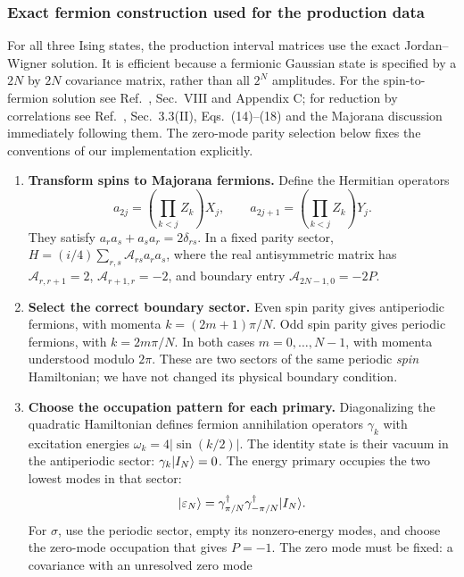\subsubsection{Exact fermion construction used for the production data}
For all three Ising states, the production interval
matrices use the exact Jordan--Wigner solution. It is efficient
because a fermionic Gaussian state is specified by a $2N$ by $2N$
covariance matrix, rather than all $2^N$ amplitudes.
For the spin-to-fermion solution see Ref.~\cite{Montes2017}, Sec.~VIII
and Appendix C; for reduction by correlations see
Ref.~\cite{PeschelEisler}, Sec.~3.3(II), Eqs.~(14)--(18) and the
Majorana discussion immediately following them. The zero-mode parity
selection below fixes the conventions of our implementation explicitly.
\begin{enumerate}
\item \textbf{Transform spins to Majorana fermions.}
Define the Hermitian operators
\begin{equation}
 a_{2j}=\left(\prod_{k<j}Z_k\right)X_j,\qquad
 a_{2j+1}=\left(\prod_{k<j}Z_k\right)Y_j.
\end{equation}
They satisfy $a_ra_s+a_sa_r=2\delta_{rs}$.
In a fixed parity sector,
$H=(i/4)\sum_{r,s}\mathcal A_{rs}a_ra_s$, where the real
antisymmetric matrix has $\mathcal A_{r,r+1}=2$,
$\mathcal A_{r+1,r}=-2$, and boundary entry
$\mathcal A_{2N-1,0}=-2P$.
\item \textbf{Select the correct boundary sector.}
Even spin parity gives antiperiodic fermions, with momenta
$k=(2m+1)\pi/N$. Odd spin parity gives periodic fermions, with
$k=2m\pi/N$. In both cases $m=0,\ldots,N-1$, with momenta understood
modulo $2\pi$. These are two sectors of the same periodic \emph{spin}
Hamiltonian; we have not changed its physical boundary condition.
\item \textbf{Choose the occupation pattern for each primary.}
Diagonalizing the quadratic Hamiltonian defines fermion annihilation
operators $\gamma_k$ with excitation energies
$\omega_k=4|\sin(k/2)|$.
The identity state is their vacuum in the antiperiodic sector:
$\gamma_k\lvert I_N\rangle=0$.
The energy primary occupies the two lowest modes in that sector:
\begin{equation}
 \lvert \varepsilon_N\rangle=\gamma_{\pi/N}^\dagger\gamma_{-\pi/N}^\dagger\lvert I_N\rangle.
\end{equation}
For $\sigma$, use the periodic sector, empty its nonzero-energy modes,
and choose the zero-mode occupation that gives $P=-1$.
The zero mode must be fixed: a covariance with an unresolved zero mode

\end{enumerate}
